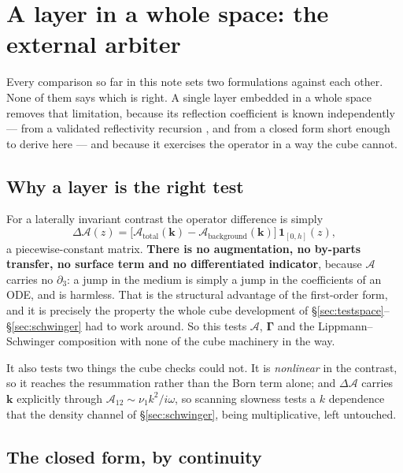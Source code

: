 \documentclass[11pt,a4paper]{article}
\newcommand{\Aop}{\mathcal{A}}
\newcommand{\dA}{\Delta\mathcal{A}}
\begin{document}
\section{A layer in a whole space: the external
arbiter}\label{sec:layer}

Every comparison so far in this note sets two formulations against each other.
None of them says which is right.  A single layer embedded in a whole space
removes that limitation, because its reflection coefficient is known
independently --- from a validated reflectivity recursion \cite{kennett1983}, and from a closed
form short enough to derive here --- and because it exercises the operator in a
way the cube cannot.

\subsection{Why a layer is the right test}

For a laterally invariant contrast the operator difference is simply
\begin{equation}\label{eq:dalayer}
  \dA(z) = \bigl[\Aop_{\text{total}}(\mathbf{k}) -
                 \Aop_{\text{background}}(\mathbf{k})\bigr]\,
           \mathbf{1}_{[0,h]}(z),
\end{equation}
a piecewise-constant matrix.  \textbf{There is no augmentation, no by-parts
transfer, no surface term and no differentiated indicator}, because $\Aop$
carries no $\partial_3$: a jump in the medium is simply a jump in the
coefficients of an ODE, and is harmless.  That is the structural advantage of
the first-order form, and it is precisely the property the whole cube
development of \S\ref{sec:testspace}--\S\ref{sec:schwinger} had to work around.
So this tests $\Aop$, $\boldsymbol\Gamma$ and the Lippmann--Schwinger
composition with none of the cube machinery in the way.

It also tests two things the cube checks could not.  It is \emph{nonlinear} in
the contrast, so it reaches the resummation rather than the Born term alone; and
$\dA$ carries $\mathbf{k}$ explicitly through $\Aop_{12} \sim \nu_1k^2/i\omega$,
so scanning slowness tests a $k$ dependence that the density channel of
\S\ref{sec:schwinger}, being multiplicative, left untouched.

\subsection{The closed form, by continuity}
\end{document}
